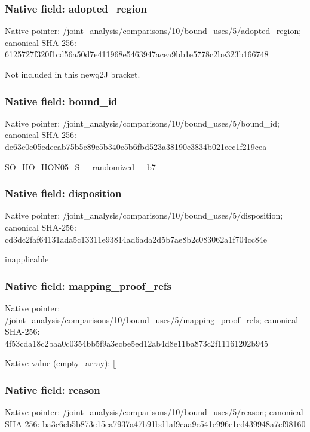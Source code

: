 \documentclass[10pt,a4paper]{article}
\begin{document}
\subsubsection{Native field: adopted\_\allowbreak{}region}
Native pointer: /joint\_\allowbreak{}analysis/comparisons/10/bound\_\allowbreak{}uses/5/adopted\_\allowbreak{}region; canonical SHA-256: 6125727f320f1cd56a50d7e411968e5463947acea9bb1e5778c2be323b166748

\begingroup\raggedright\sloppy Not included in this newq2J bracket.\par\endgroup

\subsubsection{Native field: bound\_\allowbreak{}id}
Native pointer: /joint\_\allowbreak{}analysis/comparisons/10/bound\_\allowbreak{}uses/5/bound\_\allowbreak{}id; canonical SHA-256: de63c0e05edeeab75b5c89e5b340c5b6fbd523a38190e3834b021eec1f219cea

\begingroup\raggedright\sloppy SO\_\allowbreak{}HO\_\allowbreak{}HON05\_\allowbreak{}S\_\allowbreak{}\_\allowbreak{}randomized\_\allowbreak{}\_\allowbreak{}b7\par\endgroup

\subsubsection{Native field: disposition}
Native pointer: /joint\_\allowbreak{}analysis/comparisons/10/bound\_\allowbreak{}uses/5/disposition; canonical SHA-256: cd3dc2faf64131ada5c13311e93814ad6ada2d5b7ae8b2c083062a1f704cc84e

\begingroup\raggedright\sloppy inapplicable\par\endgroup

\subsubsection{Native field: mapping\_\allowbreak{}proof\_\allowbreak{}refs}
Native pointer: /joint\_\allowbreak{}analysis/comparisons/10/bound\_\allowbreak{}uses/5/mapping\_\allowbreak{}proof\_\allowbreak{}refs; canonical SHA-256: 4f53cda18c2baa0c0354bb5f9a3ecbe5ed12ab4d8e11ba873c2f11161202b945

Native value (empty\_\allowbreak{}array): []

\subsubsection{Native field: reason}
Native pointer: /joint\_\allowbreak{}analysis/comparisons/10/bound\_\allowbreak{}uses/5/reason; canonical SHA-256: ba3c6eb5b873c15ea7937a47b91bd1af9caa9c541e996e1ed439948a7cf98160
\end{document}
